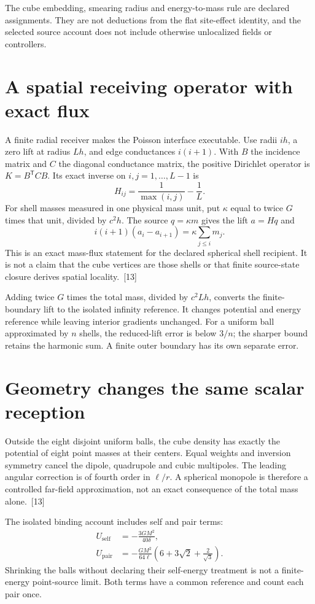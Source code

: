 \documentclass[10pt,twocolumn,letterpaper]{article}
\begin{document}
The cube embedding, smearing radius and energy-to-mass rule are declared assignments. They are not deductions from the flat site-effect identity, and the selected source account does not include otherwise unlocalized fields or controllers.

\section{A spatial receiving operator with exact flux}
A finite radial receiver makes the Poisson interface executable. Use radii $ih$, a zero lift at radius $Lh$, and edge conductances $i(i+1)$. With $B$ the incidence matrix and $C$ the diagonal conductance matrix, the positive Dirichlet operator is $K=B^{\mathsf T}CB$. Its exact inverse on $i,j=1,\ldots,L-1$ is
\[
H_{ij}=\frac{1}{\max(i,j)}-\frac{1}{L}.
\]
For shell masses measured in one physical mass unit, put $\kappa$ equal to twice $G$ times that unit, divided by $c^2h$. The source $q=\kappa m$ gives the lift $a=Hq$ and
\[
i(i+1)(a_i-a_{i+1})=\kappa\sum_{j\le i}m_j.
\]
This is an exact mass-flux statement for the declared spherical shell recipient. It is not a claim that the cube vertices are those shells or that finite source-state closure derives spatial locality.~[13]

Adding twice $G$ times the total mass, divided by $c^2Lh$, converts the finite-boundary lift to the isolated infinity reference. It changes potential and energy reference while leaving interior gradients unchanged. For a uniform ball approximated by $n$ shells, the reduced-lift error is below $3/n$; the sharper bound retains the harmonic sum. A finite outer boundary has its own separate error.

\section{Geometry changes the same scalar reception}
Outside the eight disjoint uniform balls, the cube density has exactly the potential of eight point masses at their centers. Equal weights and inversion symmetry cancel the dipole, quadrupole and cubic multipoles. The leading angular correction is of fourth order in $\ell/r$. A spherical monopole is therefore a controlled far-field approximation, not an exact consequence of the total mass alone.~[13]

The isolated binding account includes self and pair terms:
\[
\begin{aligned}
U_{\mathrm{self}}&=-\frac{3GM^2}{40\delta},\\
U_{\mathrm{pair}}&=-\frac{GM^2}{64\ell}\left(6+3\sqrt{2}+\frac{2}{\sqrt{3}}\right).
\end{aligned}
\]
Shrinking the balls without declaring their self-energy treatment is not a finite-energy point-source limit. Both terms have a common reference and count each pair once.
\end{document}
